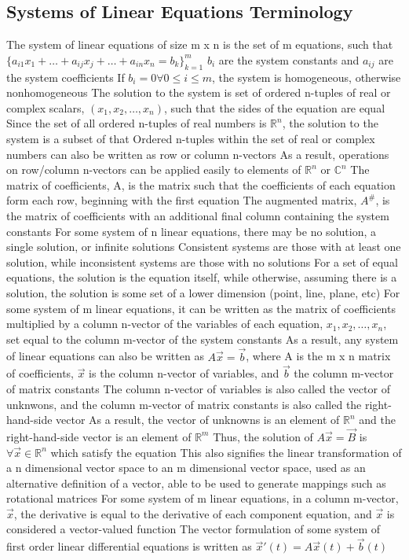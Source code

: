 \documentclass[11 pt, twoside]{article}
\newenvironment{outline*}
{
	\begin{outline}[enumerate]
	}
	{\end{outline}
}
\begin{document}
\subsection{Systems of Linear Equations Terminology}
\begin{outline*}
\1 The system of linear equations of size m x n is the set of m equations, such that $\{a_{i1}x_1 + \dots + a_{ij}x_j + \dots + a_{in}x_n = b_k\}_{k=1}^m$
\2 $b_i$ are the system constants and $a_{ij}$ are the system coefficients
\3 If $b_{i} = 0 \forall 0 \leq i \leq m$, the system is homogeneous, otherwise nonhomogeneous
\2 The solution to the system is set of ordered n-tuples of real or complex scalars, $(x_1, x_2, \dots, x_n)$, such that the sides of the equation are equal
\3 Since the set of all ordered n-tuples of real numbers is $\mathbb{R}^n$, the solution to the system is a subset of that
\3 Ordered n-tuples within the set of real or complex numbers can also be written as row or column n-vectors
\3 As a result, operations on row/column n-vectors can be applied easily to elements of $\mathbb{R}^n$ or $\mathbb{C}^n$
\2 The matrix of coefficients, A, is the matrix such that the coefficients of each equation form each row, beginning with the first equation
\2 The augmented matrix, $A^\#$, is the matrix of coefficients with an additional final column containing the system constants
\1 For some system of n linear equations, there may be no solution, a single solution, or infinite solutions
\2 Consistent systems are those with at least one solution, while inconsistent systems are those with no solutions
\2 For a set of equal equations, the solution is the equation itself, while otherwise, assuming there is a solution, the solution is some set of a lower dimension (point, line, plane, etc)
\1 For some system of m linear equations, it can be written as the matrix of coefficients multiplied by a column n-vector of the variables of each equation, $x_1, x_2, \dots, x_n$, set equal to the column m-vector of the system constants
\2 As a result, any system of linear equations can also be written as $A\vec{x} = \vec{b}$, where A is the m x n matrix of coefficients, $\vec{x}$ is the column n-vector of variables, and $\vec{b}$ the column m-vector of matrix constants
\3 The column n-vector of variables is also called the vector of unknwons, and the column m-vector of matrix constants is also called the right-hand-side vector
\3 As a result, the vector of unknowns is an element of $\mathbb{R}^n$ and the right-hand-side vector is an element of $\mathbb{R}^m$
\3 Thus, the solution of $A\vec{x} = \vec{B}$ is $\forall\vec{x} \in \mathbb{R}^n$ which satisfy the equation
\3 This also signifies the linear transformation of a n dimensional vector space to an m dimensional vector space, used as an alternative definition of a vector, able to be used to generate mappings such as rotational matrices
\1 For some system of m linear equations, in a column m-vector, $\vec{x}$, the derivative is equal to the derivative of each component equation, and $\vec{x}$ is considered a vector-valued function
\1 The vector formulation of some system of first order linear differential equations is written as $\vec{x}'(t) = A\vec{x}(t) + \vec{b}(t)$
\end{outline*}
\end{document}

